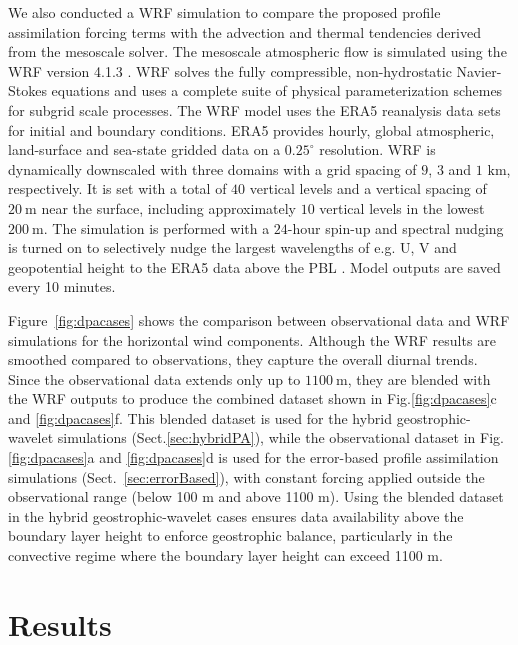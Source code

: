 We also conducted a WRF simulation to compare the proposed profile assimilation forcing terms with the advection and thermal tendencies derived from the mesoscale solver. The mesoscale atmospheric flow is simulated using the WRF version 4.1.3 \citep{skamarock2004evaluating}. WRF solves the fully compressible, non-hydrostatic Navier-Stokes equations and uses a complete suite of physical parameterization schemes for subgrid scale processes. The WRF model uses the ERA5 reanalysis data sets \citep{hersbach2020era5} for initial and boundary conditions. ERA5 provides hourly, global atmospheric, land-surface and sea-state gridded data on a $0.25^\circ$ resolution. WRF is dynamically downscaled with three domains with a grid spacing of $9$, $3$ and $1$ $\mathrm{km}$, respectively. It is set with a total of $40$ vertical levels and a vertical spacing of $20~\mathrm{m}$ near the surface, including approximately $10$ vertical levels in the lowest $200~\mathrm{m}$. The simulation is performed with a $24$-hour spin-up and spectral nudging is turned on to selectively nudge the largest wavelengths of e.g. U, V and geopotential height to the ERA5 data above the PBL \citep{miguez2004spectral}. Model outputs are saved every 10 minutes. 

Figure~\ref{fig:dpacases} shows the comparison between observational data and WRF simulations for the horizontal wind components. Although the WRF results are smoothed compared to observations, they capture the overall diurnal trends. Since the observational data extends only up to $1100~\mathrm{m}$, they are blended with the WRF outputs to produce the combined dataset shown in Fig.\ref{fig:dpacases}c and \ref{fig:dpacases}f. This blended dataset is used for the hybrid geostrophic-wavelet simulations (Sect.\ref{sec:hybridPA}), while the observational dataset in Fig.\ref{fig:dpacases}a and \ref{fig:dpacases}d is used for the error-based profile assimilation simulations (Sect.~\ref{sec:errorBased}), with constant forcing applied outside the observational range (below 100 m and above 1100 m). Using the blended dataset in the hybrid geostrophic-wavelet cases ensures data availability above the boundary layer height to enforce geostrophic balance, particularly in the convective regime where the boundary layer height can exceed 1100 m.
\section{Results}
\label{sec:results}

